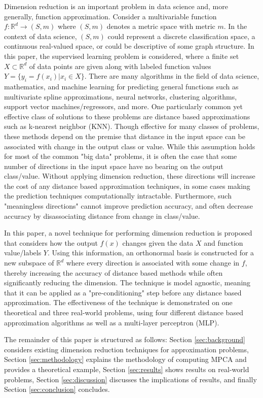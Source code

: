 \documentclass{scspaperproc}
\theoremstyle{scsthe}
\begin{document}
Dimension reduction is an important problem in data science and, more
generally, function approximation. Consider a multivariable function
$f : \mathbb{R}^d \rightarrow (S, m)$ where $(S,m)$ denotes a metric
space with metric $m$. In the context of data science, $(S,m)$ could
represent a discrete classification space, a continuous real-valued
space, or could be descriptive of some graph structure. In this paper,
the supervised learning problem is considered, where a finite set $X
\subset \mathbb{R}^d$ of data points are given along with labeled
function values $Y = \{y_i = f(x_i) | x_i \in X\}$.  There are many
algorithms in the field of data science, mathematics, and machine
learning for predicting general functions such as multivariate spline
approximations, neural networks, clustering algorithms, support vector
machines/regressors, and more. One particularly common yet effective
class of solutions to these problems are distance based approximations
such as k-nearest neighbor (KNN).  Though effective for many classes
of problems, these methods depend on the premise that distance in the
input space can be associated with change in the output class or
value. While this assumption holds for most of the common "big data"
problems, it is often the case that some number of directions in the
input space have no bearing on the output class/value. Without
applying dimension reduction, these directions will increase the cost
of any distance based approximation techniques, in some cases making
the prediction techniques computationally intractable.  Furthermore,
such "meaningless directions" cannot improve prediction accuracy, and
often decrease accuracy by disassociating distance from change in
class/value.

In this paper, a novel technique for performing dimension reduction is
proposed that considers how the output $f(x)$ changes given the data
$X$ and function value/labels $Y$. Using this information, an
orthonormal basis is constructed for a new subspace of $\mathbb{R}^d$
where every direction is associated with some change in $f$, thereby
increasing the accuracy of distance based methods while often
significantly reducing the dimension. The technique is model agnostic,
meaning that it can be applied as a "pre-conditioning" step before any
distance based approximation. The effectiveness of the technique is
demonstrated on one theoretical and three real-world problems, using
four different distance based approximation algorithms as well as a
multi-layer perceptron (MLP).

The remainder of this paper is structured as follows: Section
\ref{sec:background} considers existing dimension reduction techniques
for approximation problems, Section \ref{sec:methodology} explains the
methodology of computing MPCA and provides a theoretical example,
Section \ref{sec:results} shows results on real-world problems,
Section \ref{sec:discussion} discusses the implications of results,
and finally Section \ref{sec:conclusion} concludes.
\end{document}
